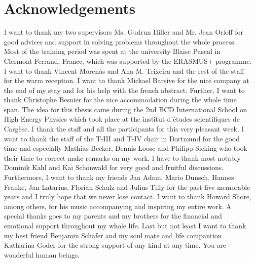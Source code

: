 \newpage
\section*{Acknowledgements}
I want to thank my two supervisors Ms. Gudrun Hiller and Mr. Jean Orloff for good advices and support in solving problems throughout the whole
process. Most of
the training period was spent at the university Blaise Pascal in Clermont-Ferrand, France, which was supported by the ERASMUS+ programme. I want
to thank Vincent Morenás and Ana M. Teixeira and the rest of the staff for the warm reception. I want to thank Mickael Barsive for the nice company 
at the end of my stay and for his
help with the french abstract. Further, I want to thank Christophe Besnier for the nice accommodation during the whole time span. The idea for this 
thesis came during the 2nd BCD International School on High Energy Physics which took place at the institut d'études scientifiques de Cargèse. I thank
the staff and all the participants for this very pleasant week. I want to thank the staff of the T-III and T-IV chair in Dortmund for the good time 
and especially Mathias Becker,
Dennis Loose and Philipp Sicking who took their time to correct make remarks on my work. I have to thank most notably Dominik Kahl and Kai Schönwald 
for very good and fruitful 
discussions. Furthermore, I want to thank my friends Jan Adam, Mario Dunsch, Hannes Franke, Jan Latarius, Florian Schulz and Julius Tilly for the past 
five memorable years and I truly hope that we never lose contact. I want to thank Howard Shore, among others, for his music accompanying
and inspiring
my entire work. A special thanks goes to my parents and my brothers for the financial and emotional support throughout my whole life. Last but not least
I want to thank my best friend Benjamin Schäfer and my soul mate and life compantion Katharina Goder for the strong support of any kind at any time. 
You are wonderful human beings.



